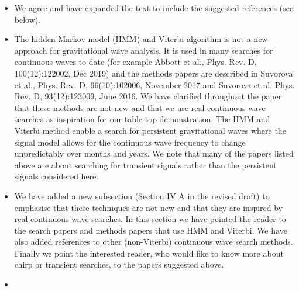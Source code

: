 \documentclass{article}
\newcommand{\todo}{\textcolor{blue}}
\newcommand{\han}{\textcolor{orange}}
\begin{document}
\begin{itemize}
\item We agree and have expanded the text to include the suggested references (see below). 
\item The hidden Markov model (HMM) and Viterbi algorithm is not a new approach for gravitational wave analysis. It is used in many searches for continuous waves to date (for example Abbott et al., Phys. Rev. D, 100(12):122002, Dec 2019) and the methods papers are described in Suvorova et al., Phys. Rev. D, 96(10):102006, November 2017 and Suvorova et al. Phys. Rev. D, 93(12):123009, June 2016. We have clarified throughout the paper that these methods are not new and that we use real continuous wave searches as inspiration for our table-top demonstration. The HMM and Viterbi method enable a search for persistent gravitational waves where the signal model allows for the continuous wave frequency to change unpredictably over months and years. We note that many of the papers listed above are about searching for transient signals rather than the persistent signals considered here. 
\item We have added a new subsection (Section IV A in the revised draft) to emphasise that these techniques are not new and that they are inspired by real continuous wave searches. In this section we have pointed the reader to the search papers and methods papers that use HMM and Viterbi. We have also added references to other (non-Viterbi) continuous wave search methods. Finally we point the interested reader, who would like to know more about chirp or transient searches, to the papers suggested above. 
\item[]
\end{itemize}
\end{document}
